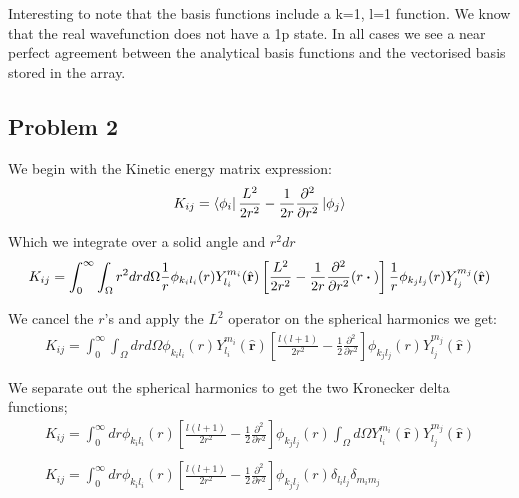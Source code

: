 \documentclass{article}
\renewcommand{\vec}[1]{\mathbf{#1}}
\let\oldhat\hat
\renewcommand{\hat}[1]{\oldhat{\mathbf{#1}}}
\begin{document}
    Interesting to note that the basis functions include a k=1, l=1 function. We know that the real wavefunction does not have a 1p state.
    In all cases we see a near perfect agreement  between the analytical basis functions and the vectorised basis stored in the array.
    
    
    \subsection{Problem 2}
    
    We begin with the Kinetic energy matrix expression:
    \large
    \begin{gather}
    	K_{ij} = \bra{\phi_i} \frac{L^2}{2r^2} -\frac{1}{2r}\frac{\partial^2}{\partial r^2} \ket{\phi_j}
    \end{gather}
    \normalsize
    
    Which we integrate over a solid angle and $r^2dr$
    \large
    \begin{gather}
    	K_{ij} = \int_{0}^{\infty}\int_{\Omega} r^2drd\Omega \frac{1}{r}\phi_{k_il_i}(r)Y^{m_i}_{l_i} (\hat{\vec{r}}) \left[ \frac{L^2}{2r^2} -\frac{1}{2r}\frac{\partial^2}{\partial r^2}(r\dotproduct{}) \right] \frac{1}{r}\phi_{k_jl_j}(r)Y^{m_j}_{l_j}(\hat{\vec{r}})
    \end{gather}
    \normalsize
    
    We cancel the $r$'s and apply the $L^2$ operator on the spherical harmonics we get:
    \large
    \begin{gather}
    	K_{ij} = \int_{0}^{\infty}\int_{\Omega} drd\Omega \phi_{k_il_i}(r)Y^{m_i}_{l_i} (\hat{\vec{r}}) \left[ \frac{l(l+1)}{2r^2} -\frac{1}{2}\frac{\partial^2}{\partial r^2} \right] \phi_{k_jl_j}(r)Y^{m_j}_{l_j}(\hat{\vec{r}})
    \end{gather}
    \normalsize
    
    We separate out the spherical harmonics to get the two Kronecker delta functions;
    \large
    \begin{gather}
    	K_{ij} = \int_{0}^{\infty} dr \phi_{k_il_i}(r) \left[ \frac{l(l+1)}{2r^2} -\frac{1}{2}\frac{\partial^2}{\partial r^2} \right] \phi_{k_jl_j}(r) \int_{\Omega}d\Omega Y^{m_i}_{l_i}(\hat{\vec{r}})Y^{m_j}_{l_j}(\hat{\vec{r}})\\
    	\\
    	K_{ij} = \int_{0}^{\infty} dr \phi_{k_il_i}(r) \left[ \frac{l(l+1)}{2r^2} -\frac{1}{2}\frac{\partial^2}{\partial r^2} \right] \phi_{k_jl_j}(r) \delta_{l_il_j} \delta_{m_im_j}
    \end{gather}
    \normalsize
    
\end{document}
